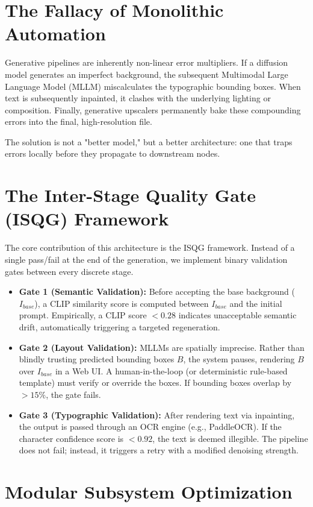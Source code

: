 \documentclass[10pt,journal,compsoc]{IEEEtran}
\begin{document}
\section{The Fallacy of Monolithic Automation}
Generative pipelines are inherently non-linear error multipliers. If a diffusion model generates an imperfect background, the subsequent Multimodal Large Language Model (MLLM) miscalculates the typographic bounding boxes. When text is subsequently inpainted, it clashes with the underlying lighting or composition. Finally, generative upscalers permanently bake these compounding errors into the final, high-resolution file.

The solution is not a "better model," but a better architecture: one that traps errors locally before they propagate to downstream nodes.

\section{The Inter-Stage Quality Gate (ISQG) Framework}
The core contribution of this architecture is the ISQG framework. Instead of a single pass/fail at the end of the generation, we implement binary validation gates between every discrete stage.

\begin{itemize}
    \item \textbf{Gate 1 (Semantic Validation):} Before accepting the base background ($I_{base}$), a CLIP similarity score is computed between $I_{base}$ and the initial prompt. Empirically, a CLIP score $< 0.28$ indicates unacceptable semantic drift, automatically triggering a targeted regeneration.
    \item \textbf{Gate 2 (Layout Validation):} MLLMs are spatially imprecise. Rather than blindly trusting predicted bounding boxes $B$, the system pauses, rendering $B$ over $I_{base}$ in a Web UI. A human-in-the-loop (or deterministic rule-based template) must verify or override the boxes. If bounding boxes overlap by $> 15\%$, the gate fails.
    \item \textbf{Gate 3 (Typographic Validation):} After rendering text via inpainting, the output is passed through an OCR engine (e.g., PaddleOCR). If the character confidence score is $< 0.92$, the text is deemed illegible. The pipeline does not fail; instead, it triggers a retry with a modified denoising strength.
\end{itemize}

\section{Modular Subsystem Optimization}
\end{document}
